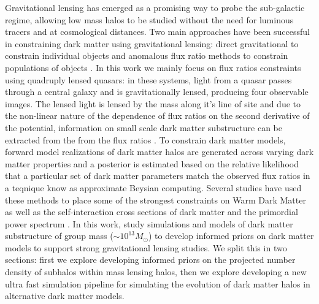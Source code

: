  Gravitational lensing has emerged as a promising way to probe the sub-galactic regime, allowing low mass halos to be studied without the need for luminous tracers and at cosmological distances.
 Two main approaches have been successful in constraining dark matter using gravitational lensing: direct gravitational to constrain individual objects \citep[e.g.][]{vegetti2010detection, minor2021unexpected} and anomalous flux ratio methods to constrain populations of objects \citep[e.g.][]{gilman2019warm, gilman2023constraining}.
 In this work we mainly focus on flux ratios constraints using quadruply lensed quasars: in these systems, light from a quasar passes through a central galaxy and is gravitationally lensed, producing four observable images. 
 The lensed light is lensed by the mass along it's line of site and due to the non-linear nature of the dependence of flux ratios on the second derivative of the potential, information on small scale dark matter substructure can be extracted from the from the flux ratios \cite{gilman2019warm}. 
 To constrain dark matter models, forward model realizations of dark matter halos are generated across varying dark matter properties and a posterior is estimated based on the relative likelihood that a particular set of dark matter parameters match the observed flux ratios in a teqnique know as approximate Beysian computing.
 Several studies have used these methods to place some of the strongest constraints on Warm Dark Matter \cite{gilman2019warm, nadler2021dark, keeley2024jwst} as well as the self-interaction cross sections of dark matter \cite{gilman2023constraining} and the primordial power spectrum \cite{gilman2022primordial}.
 In this work, study simulations and models of dark matter substructure of group mass ($\sim 10^{13} M_{\odot}$) to develop informed priors on dark matter models to support strong gravitational lensing studies.
 We split this in two sections: first we explore developing informed priors on the projected number density of subhalos within mass lensing halos, then we explore developing a new ultra fast simulation pipeline for simulating the evolution of dark matter halos in alternative dark matter models. 
 
